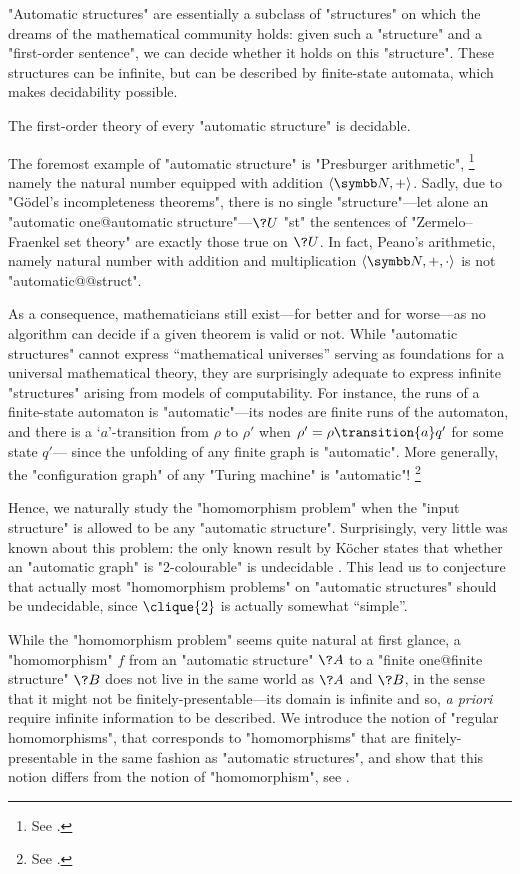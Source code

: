 "Automatic structures" are essentially a subclass of "structures" on which the dreams of
the mathematical community holds: given such a "structure" and a "first-order sentence",
we can decide whether it holds on this "structure". These structures can be infinite,
but can be described by finite-state automata, which makes decidability possible.

\begin{known}
	The first-order theory of every "automatic structure" is decidable.
\end{known}

The foremost example of "automatic structure" is "Presburger arithmetic",%
\footnote{See .}
namely the natural number equipped with addition $\tup{\N, +}$.
Sadly, due to "Gödel's incompleteness theorems", there is no single "structure"---let alone an "automatic one@automatic structure"---$\?U$ "st" the sentences of "Zermelo–Fraenkel set theory"
are exactly those true on $\?U$. In fact, Peano's arithmetic, namely natural number with
addition and multiplication $\tup{\N,+,\cdot}$ is not "automatic@@struct".

As a consequence, mathematicians still exist---for better and for worse---as no algorithm
can decide if a given theorem is valid or not.
While "automatic structures" cannot express ``mathematical universes'' serving as
foundations for a universal mathematical theory, they are surprisingly adequate to
express infinite "structures" arising from models of computability.
For instance, the runs of a finite-state automaton is "automatic"---its nodes
are finite runs of the automaton, and there is a `$a$'-transition from
$\rho$ to $\rho'$ when $\rho' = \rho \transition{a} q'$ for some state $q'$---
since the unfolding of any finite graph is "automatic".
More generally, the "configuration graph" of any "Turing machine" is "automatic"!%
\footnote{See .}

Hence, we naturally study the "homomorphism problem" when the "input structure"
is allowed to be any "automatic structure". Surprisingly, very little was known about this problem:
the only known result by Köcher states that whether an "automatic graph" is "2-colourable" is undecidable \cite{Kocher2014AutomatischenGraphen}.
This lead us to conjecture that actually most "homomorphism problems" on "automatic structures"
should be undecidable, since $\clique{2}$ is actually somewhat ``simple''.

While the "homomorphism problem" seems quite natural at first glance, a "homomorphism" $f$
from an "automatic structure" $\?A$ to a "finite one@finite structure" $\?B$ does not live
in the same world as $\?A$ and $\?B$, in the sense that it might not be finitely-presentable---its domain is infinite and so, \emph{a priori} require infinite information to be described.
We introduce the notion of "regular homomorphisms", that corresponds to "homomorphisms" that
are finitely-presentable in the same fashion as "automatic structures", and show that
this notion differs from the notion of "homomorphism",
see .

